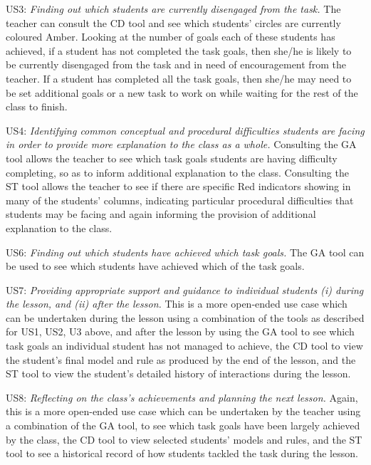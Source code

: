US3: {\em Finding out which students are currently disengaged from the
  task.} The teacher can consult the CD tool and see which students’
circles are currently coloured Amber. Looking at the number of goals
each of these students has achieved, if a student has not completed
the task goals, then she/he is likely to be currently disengaged from
the task and in need of encouragement from the teacher. If a student
has completed all the task goals, then she/he may need to be set
additional goals or a new task to work on while waiting for the rest
of the class to finish.
 
US4: {\em Identifying common conceptual and procedural difficulties
  students are facing in order to provide more explanation to the
  class as a whole.} Consulting the GA tool allows the teacher to see
which task goals students are having difficulty completing, so as to
inform additional explanation to the class.  Consulting the ST tool
allows the teacher to see if there are specific Red indicators showing
in many of the students’ columns, indicating particular procedural
difficulties that students may be facing and again informing the
provision of additional explanation to the class.

US6: {\em Finding out which students have achieved which task goals.}
The GA tool can be used to see which students have achieved which of
the task goals.
 
US7: {\em Providing appropriate support and guidance to individual
  students (i) during the lesson, and (ii) after the lesson.} This is
a more open-ended use case which can be undertaken during the lesson
using a combination of the tools as described for US1, US2, U3 above,
and after the lesson by using the GA tool to see which task goals an
individual student has not managed to achieve, the CD tool to view the
student’s final model and rule as produced by the end of the lesson,
and the ST tool to view the student’s detailed history of interactions
during the lesson.
 
US8: {\em Reflecting on the class’s achievements and planning the next
  lesson.} Again, this is a more open-ended use case which can be
undertaken by the teacher using a combination of the GA tool, to see
which task goals have been largely achieved by the class, the CD tool
to view selected students’ models and rules, and the ST tool to see a
historical record of how students tackled the task during the lesson.




